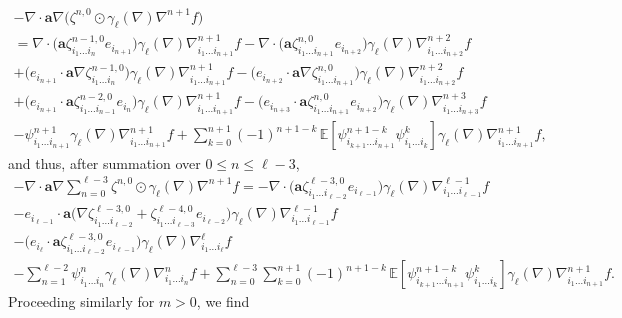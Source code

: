 \documentclass[JEP,XML,SOM,Unicode,published]{cedram}
\theoremstyle{plain}
\theoremstyle{definition}
\numberwithin{equation}{section}
\newcommand{\ee}{e}
\newcommand{\Aa}{\boldsymbol a}
\newcommand{\expec}[1]{\mathbb{E}\left[ #1 \right]}
\begin{document}
\begin{multline*}
-\nabla\cdot\Aa\nabla\big(\zeta^{n,0} \odot \gamma_{\ell}(\nabla)\nabla^{n+1} f\big)\\
=\nabla\cdot\big(\Aa\zeta^{n-1,0}_{i_1\ldots i_n}\ee_{i_{n+1}}\big)\gamma_{\ell}(\nabla)\nabla^{n+1}_{i_1\ldots i_{n+1}} f
-\nabla\cdot\big(\Aa\zeta^{n,0}_{i_1\ldots i_{n+1}}\ee_{i_{n+2}}\big)\gamma_{\ell}(\nabla)\nabla^{n+2}_{i_1\ldots i_{n+2}} f\\
+\big(\ee_{i_{n+1}}\cdot\Aa\nabla\zeta^{n-1,0}_{i_1\ldots i_n}\big)\gamma_{\ell}(\nabla)\nabla^{n+1}_{i_1\ldots i_{n+1}} f
-\big(\ee_{i_{n+2}}\cdot\Aa\nabla\zeta^{n,0}_{i_1\ldots i_{n+1}}\big) \gamma_{\ell}(\nabla)\nabla^{n+2}_{i_1\ldots i_{n+2}} f\\
+\big(\ee_{i_{n+1}}\cdot\Aa\zeta^{n-2,0}_{i_1\ldots i_{n-1}}\ee_{i_n}\big)\gamma_{\ell}(\nabla)\nabla^{n+1}_{i_1\ldots i_{n+1}} f
-\big(\ee_{i_{n+3}}\cdot\Aa\zeta^{n,0}_{i_1\ldots i_{n+1}}\ee_{i_{n+2}}\big)\gamma_{\ell}(\nabla)\nabla^{n+3}_{i_1\ldots i_{n+3}} f\\
-\psi^{n+1}_{i_1\ldots i_{n+1}}\gamma_{\ell}(\nabla)\nabla^{n+1}_{i_1\ldots i_{n+1}} f
+\sum_{k=0}^{n+1}(-1)^{n+1-k}\,\expec{\psi^{n+1-k}_{i_{k+1}\ldots i_{n+1}}\psi^k_{i_{1}\ldots i_k}}\gamma_{\ell}(\nabla)\nabla^{n+1}_{i_1\ldots i_{n+1}} f,
\end{multline*}
and thus, after summation over $0\le n\le\ell-3$,\vspace*{-3pt}
\begin{multline*}
-\nabla\cdot\Aa\nabla\sum_{n=0}^{\ell-3}\zeta^{n,0} \odot \gamma_{\ell}(\nabla)\nabla^{n+1} f
=-\nabla\cdot\big(\Aa\zeta^{\ell-3,0}_{i_1\ldots i_{\ell-2}}\ee_{i_{\ell-1}}\big)\gamma_{\ell}(\nabla)\nabla^{\ell-1}_{i_1\ldots i_{\ell-1}} f\\
-\ee_{i_{\ell-1}}\cdot\Aa\big(\nabla\zeta^{\ell-3,0}_{i_1\ldots i_{\ell-2}}+\zeta^{\ell-4,0}_{i_1\ldots i_{\ell-3}}\ee_{i_{\ell-2}}\big)\gamma_{\ell}(\nabla)\nabla^{\ell-1}_{i_1\ldots i_{\ell-1}} f\\
-\big(\ee_{i_{\ell}}\cdot\Aa\zeta^{\ell-3,0}_{i_1\ldots i_{\ell-2}}\ee_{i_{\ell-1}}\big)\gamma_{\ell}(\nabla)\nabla^{\ell}_{i_1\ldots i_{\ell}} f\\
-\sum_{n=1}^{\ell-2}\psi^{n}_{i_1\ldots i_{n}}\gamma_{\ell}(\nabla)\nabla^{n}_{i_1\ldots i_{n}} f
+\sum_{n=0}^{\ell-3}\sum_{k=0}^{n+1}(-1)^{n+1-k}\,\expec{\psi^{n+1-k}_{i_{k+1}\ldots i_{n+1}}\psi^k_{i_{1}\ldots i_k}}\gamma_{\ell}(\nabla)\nabla^{n+1}_{i_1\ldots i_{n+1}} f.
\end{multline*}
Proceeding similarly for $m>0$, we find\vspace*{-3pt}\enlargethispage{-2\baselineskip}
\end{document}

